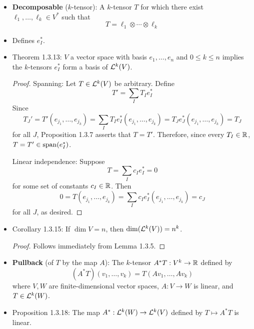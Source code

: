 \documentclass[../notes.tex]{subfiles}
\begin{document}
\begin{itemize}
    \item \textbf{Decomposable} ($k$-tensor): A $k$-tensor $T$ for which there exist $\ell_1,\dots,\ell_k\in V^*$ such that
    \begin{equation*}
        T = \ell_1\otimes\cdots\otimes\ell_k
    \end{equation*}
    \item Defines $e_I^*$.
    \item Theorem 1.3.13: $V$ a vector space with basis $e_1,\dots,e_n$ and $0\leq k\leq n$ implies the $k$-tensors $e_I^*$ form a basis of $\lin[k]{V}$.
    \begin{proof}
        Spanning: Let $T\in\lin[k]{V}$ be arbitrary. Define
        \begin{equation*}
            T' = \sum_IT_Ie_I^*
        \end{equation*}
        Since
        \begin{equation*}
            T_J' = T'(e_{j_1},\dots,e_{j_k})
            = \sum_IT_Ie_I^*(e_{j_1},\dots,e_{j_k})
            = T_Je_J^*(e_{j_1},\dots,e_{j_k})
            = T_J
        \end{equation*}
        for all $J$, Proposition 1.3.7 asserts that $T=T'$. Therefore, since every $T_I\in\R$, $T=T'\in\spn(e_I^*)$.\par
        Linear independence: Suppose
        \begin{equation*}
            T = \sum_Ic_Ie_I^* = 0
        \end{equation*}
        for some set of constants $c_I\in\R$. Then
        \begin{equation*}
            0 = T(e_{j_1},\dots,e_{j_k})
            = \sum_Ic_Ie_I^*(e_{j_1},\dots,e_{j_k})
            = c_J
        \end{equation*}
        for all $J$, as desired.
    \end{proof}
    \item Corollary 1.3.15: If $\dim V=n$, then $\dim(\lin[k]{V})=n^k$.
    \begin{proof}
        Follows immediately from Lemma 1.3.5.
    \end{proof}
    \item \textbf{Pullback} (of $T$ by the map $A$): The $k$-tensor $A^*T:V^k\to\R$ defined by
    \begin{equation*}
        (A^*T)(v_1,\dots,v_k) = T(Av_1,\dots,Av_k)
    \end{equation*}
    where $V,W$ are finite-dimensional vector spaces, $A:V\to W$ is linear, and $T\in\lin[k]{W}$.
    \item Proposition 1.3.18: The map $A^*:\lin[k]{W}\to\lin[k]{V}$ defined by $T\mapsto A^*T$ is linear.

\end{itemize}
\end{document}
